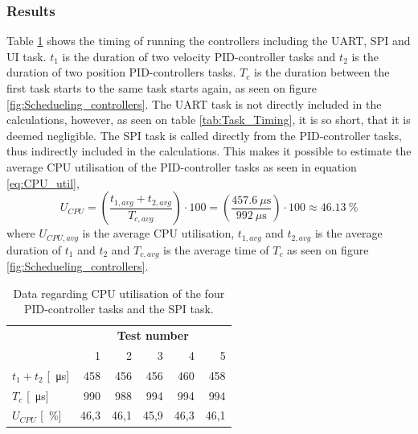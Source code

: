 \documentclass[../../main.tex]{subfiles}
\begin{document}
\subsubsection*{Results}
Table \ref{tab:CPU_utilisation_test} shows the timing of running the controllers including the UART, SPI and UI task. 
$t_1$ is the duration of two velocity PID-controller tasks and $t_2$ is the duration of two position PID-controllers tasks. $T_c$ is the duration between the first task starts to the same task starts again, as seen on figure \ref{fig:Schedueling_controllers}. The UART task is not directly included in the calculations, however, as seen on table \ref{tab:Task_Timing}, it is so short, that it is deemed negligible. The SPI task is called directly from the PID-controller tasks, thus indirectly included in the calculations. This makes it possible to estimate the average CPU utilisation of the PID-controller tasks as seen in equation \ref{eq:CPU_util},
\begin{equation}\label{eq:CPU_util}
    U_{CPU} =\left(\frac{t_{1,avg} + t_{2,avg}}{T_{c,avg}}\right)\cdot 100=\left(\frac{\SI{457,6}{\mu\second}}{\SI{992}{\mu\second}}\right)\cdot 100\approx \SI{46,13}{\percent}
\end{equation}
where $ U_{CPU,avg} $ is the average CPU utilisation, $t_{1,avg}$ and $ t_{2,avg}$ is the average duration of $t_1$ and $t_2$ and $T_{c,avg}$ is the average time of $T_c$ as seen on figure \ref{fig:Schedueling_controllers}. 

\begin{table}[H]
\centering
\begin{tabular}{lrrrrr}
\multicolumn{1}{c}{\textbf{}}            & \multicolumn{5}{c}{\textbf{Test number}}                                                                                              \\
\multicolumn{1}{r|}{}                    & \multicolumn{1}{r|}{1}    & \multicolumn{1}{r|}{2}    & \multicolumn{1}{r|}{3}    & \multicolumn{1}{r|}{4}    & \multicolumn{1}{r}{5} \\ \hline
\multicolumn{1}{l|}{$t_1 + t_2$ [\SI{}{\micro\second}]} & \multicolumn{1}{r|}{458}  & \multicolumn{1}{r|}{456}  & \multicolumn{1}{r|}{456}  & \multicolumn{1}{r|}{460}  & 458                   \\
\multicolumn{1}{l|}{$T_c$ [\SI{}{\micro\second}]}                 & \multicolumn{1}{r|}{990}  & \multicolumn{1}{r|}{988}  & \multicolumn{1}{r|}{994}  & \multicolumn{1}{r|}{994}  & 994                   \\
\multicolumn{1}{l|}{$U_{CPU}$ [\SI{}{\percent}]}          & \multicolumn{1}{r|}{46,3} & \multicolumn{1}{r|}{46,1} & \multicolumn{1}{r|}{45,9} & \multicolumn{1}{r|}{46,3} & 46,1                 
\end{tabular}
\caption{Data regarding CPU utilisation of the four PID-controller tasks and the SPI task.}
\label{tab:CPU_utilisation_test}
\end{table}
\end{document}
